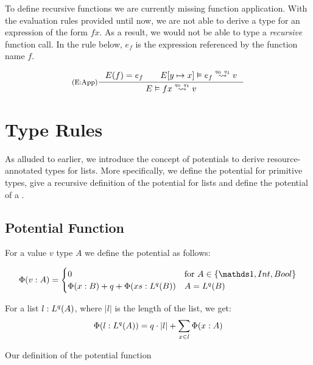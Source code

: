 To define recursive functions we are currently missing function application. With the evaluation rules provided until now, we are not able to derive a type for an expression of the form \(f x\). As a result, we would not be able to type a \emph{recursive} function call. 
In the rule below, \(e_f\) is the expression referenced by the function name \(f\). 

\[
   \inference[(E:App)]
   {E(f) = e_f \qquad \evals{\envaugment{E}{y}{x}}{e_f}{v}{q_0}{q_1}}
   {\evals{E}{f x}{v}{q_0}{q_1}}
\]

\section{Type Rules}

As alluded to earlier, we introduce the concept of potentials to derive resource-annotated types for lists. More specifically, we define the potential for primitive types, give a recursive definition of the potential for lists and define the potential of a . 

\subsection{Potential Function}

\begin{definition}
   For a value \(v\) type \(A\) we define the potential as follows:

   \[
      \Phi(v : A) = \begin{cases}
         0                                            &\text{for } A \in \{\unit, \typeint, \bool\} \\
         \Phi(x : B) + q + \Phi(xs : \ralist{q}{B})  & A = \ralist{q}{B}\\
                    \end{cases}
   \]
\end{definition}

\begin{corollary}
   For a list \(l : L^{q}(A)\), where \(|l|\) is the length of the list, we get:
   \[
      \Phi(l : L^{q}(A)) = q \cdot |l| + \sum_{x \in l} \Phi(x : A)
   \]
\end{corollary}

Our definition of the potential function 


